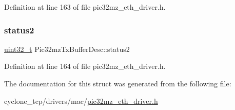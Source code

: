 Definition at line 163 of file pic32mz\+\_\+eth\+\_\+driver.\+h.

\mbox{\label{structPic32mzTxBufferDesc_a7f506326e97225e3c6a3d58a34fe12e2}} 
\subsubsection{\texorpdfstring{status2}{status2}}
{\footnotesize\ttfamily \hyperlink{stdint_8h_a435d1572bf3f880d55459d9805097f62}{uint32\+\_\+t} Pic32mz\+Tx\+Buffer\+Desc\+::status2}



Definition at line 164 of file pic32mz\+\_\+eth\+\_\+driver.\+h.



The documentation for this struct was generated from the following file\+:\begin{DoxyCompactItemize}
\item 
cyclone\+\_\+tcp/drivers/mac/\hyperlink{pic32mz__eth__driver_8h}{pic32mz\+\_\+eth\+\_\+driver.\+h}\end{DoxyCompactItemize}
